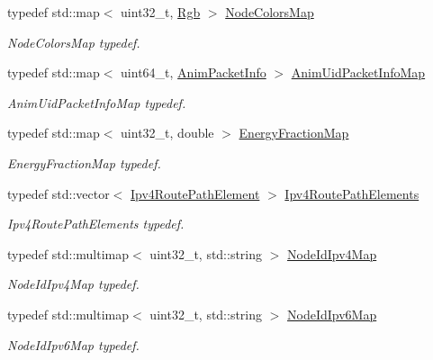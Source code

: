 \begin{DoxyCompactItemize}
typedef std\+::map$<$ uint32\+\_\+t, \hyperlink{structns3_1_1AnimationInterface_1_1Rgb}{Rgb} $>$ \hyperlink{classns3_1_1AnimationInterface_a1aa744d7fb287937039e55371802f8ce}{Node\+Colors\+Map}
\begin{DoxyCompactList}\small\item\em Node\+Colors\+Map typedef. \end{DoxyCompactList}\item 
typedef std\+::map$<$ uint64\+\_\+t, \hyperlink{classns3_1_1AnimationInterface_1_1AnimPacketInfo}{Anim\+Packet\+Info} $>$ \hyperlink{classns3_1_1AnimationInterface_afea577896009c4134df836bc20f1eabe}{Anim\+Uid\+Packet\+Info\+Map}
\begin{DoxyCompactList}\small\item\em Anim\+Uid\+Packet\+Info\+Map typedef. \end{DoxyCompactList}\item 
typedef std\+::map$<$ uint32\+\_\+t, double $>$ \hyperlink{classns3_1_1AnimationInterface_a868459efb0dd7edd1ec83d7c0f8cd365}{Energy\+Fraction\+Map}
\begin{DoxyCompactList}\small\item\em Energy\+Fraction\+Map typedef. \end{DoxyCompactList}\item 
typedef std\+::vector$<$ \hyperlink{structns3_1_1AnimationInterface_1_1Ipv4RoutePathElement}{Ipv4\+Route\+Path\+Element} $>$ \hyperlink{classns3_1_1AnimationInterface_a7c7711cf651506df80a9eb3026603c52}{Ipv4\+Route\+Path\+Elements}
\begin{DoxyCompactList}\small\item\em Ipv4\+Route\+Path\+Elements typedef. \end{DoxyCompactList}\item 
typedef std\+::multimap$<$ uint32\+\_\+t, std\+::string $>$ \hyperlink{classns3_1_1AnimationInterface_ae425e5a70267f86f9c979eda36573041}{Node\+Id\+Ipv4\+Map}
\begin{DoxyCompactList}\small\item\em Node\+Id\+Ipv4\+Map typedef. \end{DoxyCompactList}\item 
typedef std\+::multimap$<$ uint32\+\_\+t, std\+::string $>$ \hyperlink{classns3_1_1AnimationInterface_a39ea5e1a91cfc2537825073a9bc8bd58}{Node\+Id\+Ipv6\+Map}
\begin{DoxyCompactList}\small\item\em Node\+Id\+Ipv6\+Map typedef. \end{DoxyCompactList}\item 

\end{DoxyCompactItemize}
